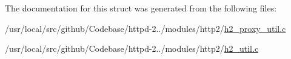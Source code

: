 The documentation for this struct was generated from the following files\+:\begin{DoxyCompactItemize}
\item 
/usr/local/src/github/\+Codebase/httpd-\/2../modules/http2/\hyperlink{h2__proxy__util_8c}{h2\+\_\+proxy\+\_\+util.\+c}\item 
/usr/local/src/github/\+Codebase/httpd-\/2../modules/http2/\hyperlink{h2__util_8c}{h2\+\_\+util.\+c}\end{DoxyCompactItemize}

